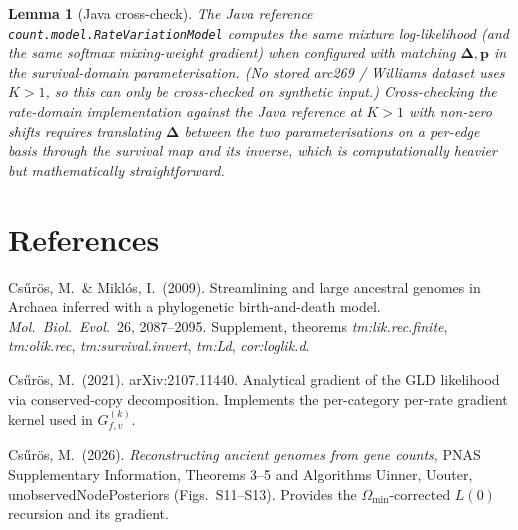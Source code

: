\documentclass[11pt]{article}
\newcommand{\Om}{\Omega}
\newtheorem{lemma}[theorem]{Lemma}
\theoremstyle{definition}
\begin{document}
\begin{lemma}[Java cross-check]\label{lem:java}
The Java reference \texttt{count.model.RateVariationModel} computes
the same mixture log-likelihood (and the same softmax mixing-weight
gradient) when configured with matching $\bm\Delta, \bm p$ \emph{in
the survival-domain parameterisation}. (No stored arc269 / Williams
dataset uses $K > 1$, so this can only be cross-checked on synthetic
input.) Cross-checking the rate-domain implementation against the
Java reference at $K>1$ with non-zero shifts requires translating
$\bm\Delta$ between the two parameterisations on a per-edge basis
through the survival map and its inverse, which is computationally
heavier but mathematically straightforward.
\end{lemma}

\section*{References}

\begin{description}[leftmargin=2em]
\item[CM09] Cs\H{u}r\"os, M.\ \& Mikl\'os, I.\ (2009).
  Streamlining and large ancestral genomes in Archaea inferred with
  a phylogenetic birth-and-death model.
  \emph{Mol.\ Biol.\ Evol.}\ 26, 2087--2095. Supplement, theorems
  \emph{tm:lik.rec.finite}, \emph{tm:olik.rec}, \emph{tm:survival.invert},
  \emph{tm:Ld}, \emph{cor:loglik.d}.

\item[Cs21] Cs\H{u}r\"os, M.\ (2021).
  arXiv:2107.11440. Analytical gradient of the GLD likelihood via
  conserved-copy decomposition. Implements the per-category
  per-rate gradient kernel used in $G^{(k)}_{f,v}$.

\item[Cs26] Cs\H{u}r\"os, M.\ (2026). \emph{Reconstructing ancient
  genomes from gene counts}, PNAS Supplementary Information,
  Theorems 3--5 and Algorithms Uinner, Uouter, unobservedNodePosteriors
  (Figs.\ S11--S13). Provides the $\Om_{\min}$-corrected $L(0)$
  recursion and its gradient.
\end{description}
\end{document}
